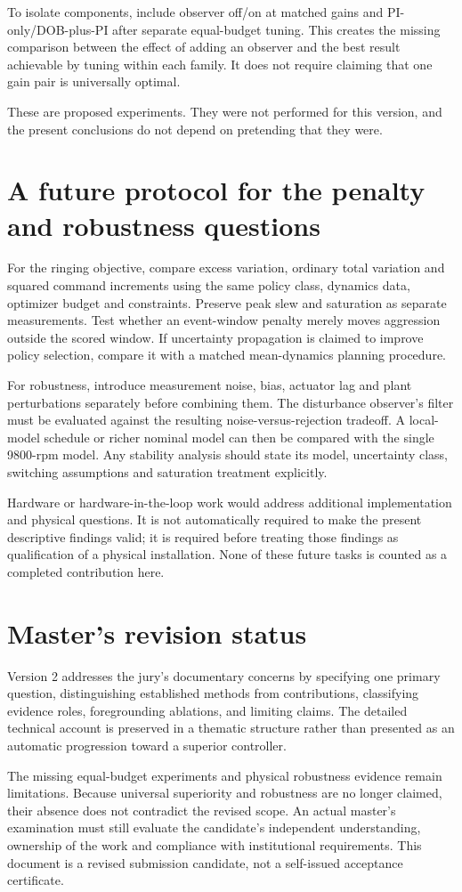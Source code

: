 To isolate components, include observer off/on at matched gains and PI-only/DOB-plus-PI after separate equal-budget tuning. This creates the missing comparison between the effect of adding an observer and the best result achievable by tuning within each family. It does not require claiming that one gain pair is universally optimal.

These are proposed experiments. They were not performed for this version, and the present conclusions do not depend on pretending that they were.

\section{A future protocol for the penalty and robustness questions}
For the ringing objective, compare excess variation, ordinary total variation and squared command increments using the same policy class, dynamics data, optimizer budget and constraints. Preserve peak slew and saturation as separate measurements. Test whether an event-window penalty merely moves aggression outside the scored window. If uncertainty propagation is claimed to improve policy selection, compare it with a matched mean-dynamics planning procedure.

For robustness, introduce measurement noise, bias, actuator lag and plant perturbations separately before combining them. The disturbance observer's filter must be evaluated against the resulting noise-versus-rejection tradeoff. A local-model schedule or richer nominal model can then be compared with the single 9800-rpm model. Any stability analysis should state its model, uncertainty class, switching assumptions and saturation treatment explicitly.

Hardware or hardware-in-the-loop work would address additional implementation and physical questions. It is not automatically required to make the present descriptive findings valid; it is required before treating those findings as qualification of a physical installation. None of these future tasks is counted as a completed contribution here.

\section{Master's revision status}
Version 2 addresses the jury's documentary concerns by specifying one primary question, distinguishing established methods from contributions, classifying evidence roles, foregrounding ablations, and limiting claims. The detailed technical account is preserved in a thematic structure rather than presented as an automatic progression toward a superior controller.

The missing equal-budget experiments and physical robustness evidence remain limitations. Because universal superiority and robustness are no longer claimed, their absence does not contradict the revised scope. An actual master's examination must still evaluate the candidate's independent understanding, ownership of the work and compliance with institutional requirements. This document is a revised submission candidate, not a self-issued acceptance certificate.
